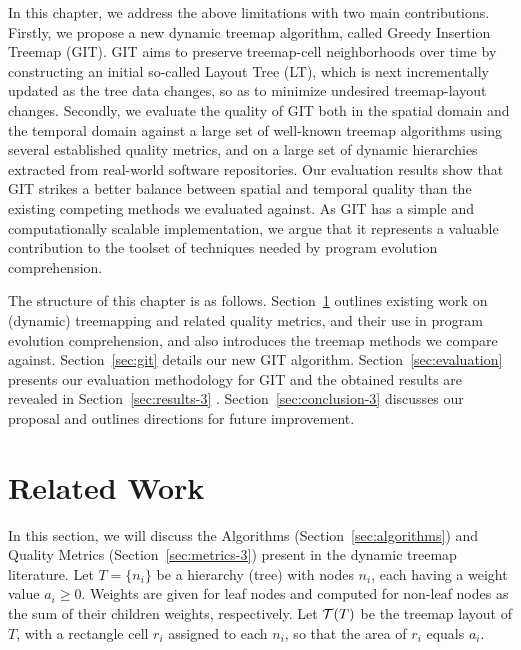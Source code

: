In this chapter, we address the above limitations with two main contributions. Firstly, we propose a new dynamic treemap algorithm, called Greedy Insertion Treemap (GIT). GIT aims to preserve treemap-cell neighborhoods over time by constructing an initial so-called Layout Tree (LT), which is next incrementally updated as the tree data changes, so as to minimize undesired treemap-layout changes.
Secondly, we evaluate the quality of GIT both in the spatial domain and the temporal domain against a large set of well-known treemap algorithms using several established quality metrics, and on a large set of dynamic hierarchies extracted from real-world software repositories. Our evaluation results show that GIT strikes a better balance between spatial and temporal quality than the existing competing methods we evaluated against. As GIT has a simple and computationally scalable implementation, we argue that it represents a valuable contribution to the toolset of techniques needed by program evolution comprehension.

The structure of this chapter is as follows. Section~\ref{sec:related_work} outlines existing work on (dynamic) treemapping and related quality metrics, and their use in program evolution comprehension, and also introduces the treemap methods we compare against. Section~\ref{sec:git} details our new GIT algorithm. Section~\ref{sec:evaluation} presents our evaluation methodology for GIT and the obtained results are revealed in Section~\ref{sec:results-3} . Section~\ref{sec:conclusion-3} discusses our proposal and outlines directions for future improvement.


\section{Related Work}
\label{sec:related_work}

In this section, we will discuss the Algorithms (Section~\ref{sec:algorithms}) and Quality Metrics (Section~\ref{sec:metrics-3}) present in the dynamic treemap literature.
Let $T= \{n_i\}$ be a hierarchy (tree) with nodes $n_i$, each having a weight value $a_i \geq 0$. Weights are given for leaf nodes and computed for non-leaf nodes as the sum of their children weights, respectively. Let ${\cal T}(T)$ be the treemap layout of $T$, with a rectangle cell $r_i$ assigned to each $n_i$, so that the area of $r_i$ equals $a_i$.

